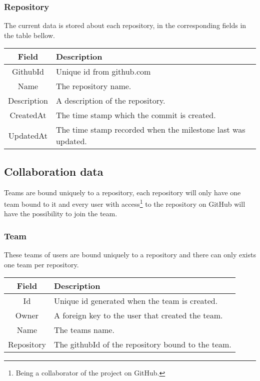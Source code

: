 \subsubsection*{Repository}
The current data is stored about each repository, in the corresponding fields in the table bellow. \\

\vspace{0.5cm}
\begin{tabularx}{\linewidth}{| c | X |}
    \hline
    \rowcolor[gray]{0.8}
    \textbf{Field} & \textbf{Description} \\
    \hline
    GithubId & Unique id from github.com\\ \hline
    Name & The repository name.\\ \hline
   	Description & A description of the repository.\\ \hline
    CreatedAt & The time stamp which the commit is created.\\ \hline
    UpdatedAt & The time stamp recorded when the milestone last was updated.\\ 
    \hline
\end{tabularx}
\vspace{0.5cm}

\subsection{Collaboration data}
Teams are bound uniquely to a repository, each repository will only have one team bound to it and every user with access\footnote{Being a collaborator of the project on GitHub.} to the repository on GitHub will have the possibility to join the team.  


\subsubsection*{Team}
These teams of users are bound uniquely to a repository and there can only exists one team per repository. \\

\vspace{0.5cm}
\begin{tabularx}{\linewidth}{| c | X |}
    \hline
    \rowcolor[gray]{0.8}
    \textbf{Field} & \textbf{Description} \\
    \hline
    Id & Unique id generated when the team is created.\\ \hline
   	Owner & A foreign key to the user that created the team.\\ \hline
   	Name & The teams name.\\ \hline
    Repository & The githubId of the repository bound to the team.\\ 
    \hline
\end{tabularx}
\vspace{0.5cm}

